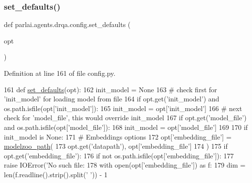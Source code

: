 \subsubsection{\texorpdfstring{set\+\_\+defaults()}{set\_defaults()}}
{\footnotesize\ttfamily def parlai.\+agents.\+drqa.\+config.\+set\+\_\+defaults (\begin{DoxyParamCaption}\item[{}]{opt }\end{DoxyParamCaption})}



Definition at line 161 of file config.\+py.


\begin{DoxyCode}
161 \textcolor{keyword}{def }\hyperlink{namespaceparlai_1_1agents_1_1drqa_1_1config_a8cc825bafeff299794cba6e2a8b65da2}{set\_defaults}(opt):
162     init\_model = \textcolor{keywordtype}{None}
163     \textcolor{comment}{# check first for 'init\_model' for loading model from file}
164     \textcolor{keywordflow}{if} opt.get(\textcolor{stringliteral}{'init\_model'}) \textcolor{keywordflow}{and} os.path.isfile(opt[\textcolor{stringliteral}{'init\_model'}]):
165         init\_model = opt[\textcolor{stringliteral}{'init\_model'}]
166     \textcolor{comment}{# next check for 'model\_file', this would override init\_model}
167     \textcolor{keywordflow}{if} opt.get(\textcolor{stringliteral}{'model\_file'}) \textcolor{keywordflow}{and} os.path.isfile(opt[\textcolor{stringliteral}{'model\_file'}]):
168         init\_model = opt[\textcolor{stringliteral}{'model\_file'}]
169 
170     \textcolor{keywordflow}{if} init\_model \textcolor{keywordflow}{is} \textcolor{keywordtype}{None}:
171         \textcolor{comment}{# Embeddings options}
172         opt[\textcolor{stringliteral}{'embedding\_file'}] = \hyperlink{namespaceparlai_1_1agents_1_1legacy__agents_1_1seq2seq_1_1utils__v0_a5fbd3301b67f00d6d146fb01c7cd7626}{modelzoo\_path}(
173             opt.get(\textcolor{stringliteral}{'datapath'}), opt[\textcolor{stringliteral}{'embedding\_file'}]
174         )
175         \textcolor{keywordflow}{if} opt.get(\textcolor{stringliteral}{'embedding\_file'}):
176             \textcolor{keywordflow}{if} \textcolor{keywordflow}{not} os.path.isfile(opt[\textcolor{stringliteral}{'embedding\_file'}]):
177                 \textcolor{keywordflow}{raise} IOError(\textcolor{stringliteral}{'No such file: %
178             with open(opt[\textcolor{stringliteral}{'embedding\_file'}]) \textcolor{keyword}{as} f:
179                 dim = len(f.readline().strip().split(\textcolor{stringliteral}{' '})) - 1
}
\end{DoxyCode}
